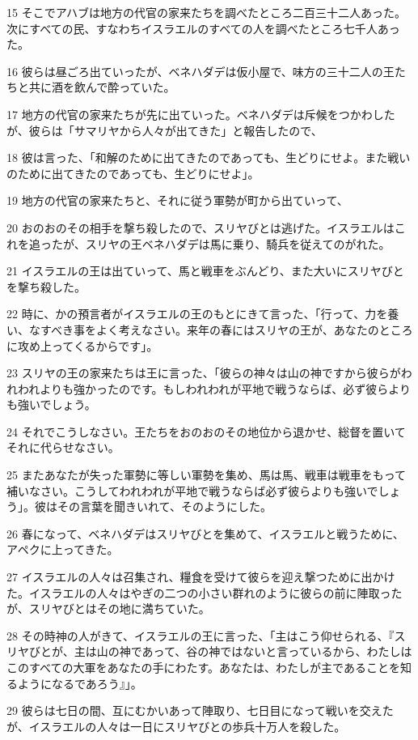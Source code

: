 \par 15 そこでアハブは地方の代官の家来たちを調べたところ二百三十二人あった。次にすべての民、すなわちイスラエルのすべての人を調べたところ七千人あった。
\par 16 彼らは昼ごろ出ていったが、ベネハダデは仮小屋で、味方の三十二人の王たちと共に酒を飲んで酔っていた。
\par 17 地方の代官の家来たちが先に出ていった。ベネハダデは斥候をつかわしたが、彼らは「サマリヤから人々が出てきた」と報告したので、
\par 18 彼は言った、「和解のために出てきたのであっても、生どりにせよ。また戦いのために出てきたのであっても、生どりにせよ」。
\par 19 地方の代官の家来たちと、それに従う軍勢が町から出ていって、
\par 20 おのおのその相手を撃ち殺したので、スリヤびとは逃げた。イスラエルはこれを追ったが、スリヤの王ベネハダデは馬に乗り、騎兵を従えてのがれた。
\par 21 イスラエルの王は出ていって、馬と戦車をぶんどり、また大いにスリヤびとを撃ち殺した。
\par 22 時に、かの預言者がイスラエルの王のもとにきて言った、「行って、力を養い、なすべき事をよく考えなさい。来年の春にはスリヤの王が、あなたのところに攻め上ってくるからです」。
\par 23 スリヤの王の家来たちは王に言った、「彼らの神々は山の神ですから彼らがわれわれよりも強かったのです。もしわれわれが平地で戦うならば、必ず彼らよりも強いでしょう。
\par 24 それでこうしなさい。王たちをおのおのその地位から退かせ、総督を置いてそれに代らせなさい。
\par 25 またあなたが失った軍勢に等しい軍勢を集め、馬は馬、戦車は戦車をもって補いなさい。こうしてわれわれが平地で戦うならば必ず彼らよりも強いでしょう」。彼はその言葉を聞きいれて、そのようにした。
\par 26 春になって、ベネハダデはスリヤびとを集めて、イスラエルと戦うために、アペクに上ってきた。
\par 27 イスラエルの人々は召集され、糧食を受けて彼らを迎え撃つために出かけた。イスラエルの人々はやぎの二つの小さい群れのように彼らの前に陣取ったが、スリヤびとはその地に満ちていた。
\par 28 その時神の人がきて、イスラエルの王に言った、「主はこう仰せられる、『スリヤびとが、主は山の神であって、谷の神ではないと言っているから、わたしはこのすべての大軍をあなたの手にわたす。あなたは、わたしが主であることを知るようになるであろう』」。
\par 29 彼らは七日の間、互にむかいあって陣取り、七日目になって戦いを交えたが、イスラエルの人々は一日にスリヤびとの歩兵十万人を殺した。
